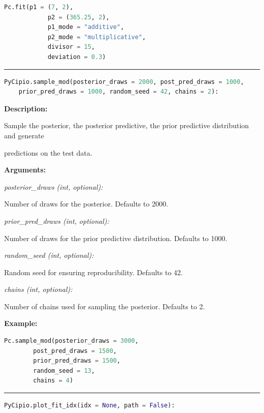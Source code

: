 \documentclass{article}
\begin{document}
\begin{lstlisting}[language=Python]
        Pc.fit(p1 = (7, 2), 
            p2 = (365.25, 2), 
            p1_mode = "additive", 
            p2_mode = "multiplicative", 
            divisor = 15, 
            deviation = 0.3)    
\end{lstlisting}


\hrule

\begin{lstlisting}[language=Python]
    PyCipio.sample_mod(posterior_draws = 2000, post_pred_draws = 1000, 
    prior_pred_draws = 1000, random_seed = 42, chains = 2):
\end{lstlisting}

\indent \textbf{Description:} 

\indent \indent Sample the posterior, the posterior predictive, the prior predictive distribution and generate 

\indent \indent predictions on the test data.

\indent \textbf{Arguments:}

\indent \indent \textit{posterior\_draws (int, optional):} 

\indent \indent \indent Number of draws for the posterior. Defaults to 2000.

\indent \indent \textit{prior\_pred\_draws (int, optional):} 

\indent \indent \indent Number of draws for the prior predictive distribution. Defaults to 1000.

\indent \indent \textit{random\_seed (int, optional):}

\indent \indent \indent Random seed for ensuring reproducibility. Defaults to 42.

\indent \indent \textit{chains (int, optional):} 

\indent \indent \indent Number of chains used for sampling the posterior. Defaults to 2.

\indent \textbf{Example:}

\begin{lstlisting}[language=Python]
        Pc.sample_mod(posterior_draws = 3000, 
        post_pred_draws = 1500, 
        prior_pred_draws = 1500, 
        random_seed = 13, 
        chains = 4)
\end{lstlisting}


\hrule

\begin{lstlisting}[language=Python]
    PyCipio.plot_fit_idx(idx = None, path = False):
\end{lstlisting}
\end{document}
